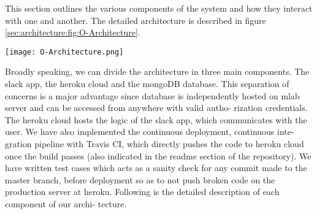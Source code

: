 This section outlines the various components of the system and how they interact with one and another. The detailed architecture is described in figure \ref{sec:architecture:fig:O-Architecture}.

\begin{figure*}[ht]
\label{sec:architecture:fig:O-Architecture}
\caption{Original Architecture Design}
\centering
\texttt{[image: O-Architecture.png]}
\end{figure*}

Broadly speaking, we can divide the architecture in three main components. The slack app, the heroku cloud and the mongoDB database. This separation of concerns is a major advantage since database is independently hosted on mlab server and can be accessed from anywhere with valid autho- rization credentials. The heroku cloud hosts the logic of the slack app, which communicates with the user. We have also implemented the continuous deployment, continuous inte- gration pipeline with Travis CI, which directly pushes the code to heroku cloud once the build passes (also indicated in the readme section of the repository). We have written test cases which acts as a sanity check for any commit made to the master branch, before deployment so as to not push broken code on the production server at heroku. Following is the detailed description of each component of our archi- tecture.

